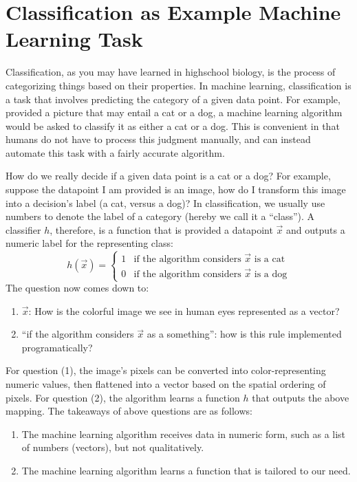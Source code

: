 \section{Classification as Example Machine Learning Task}
Classification, as you may have learned in highschool biology, is the process of categorizing things based on their properties.
In machine learning, classification is a task that involves predicting the category of a given data point.
For example, provided a picture that may entail a cat or a dog, a machine learning algorithm would be asked to classify it as either a cat or a dog.
This is convenient in that humans do not have to process this judgment manually, and can instead automate this task with a fairly accurate algorithm.

How do we really decide if a given data point is a cat or a dog?
For example, suppose the datapoint I am provided is an image, how do I transform this image into a decision's label (a cat, versus a dog)?
In classification, we usually use numbers to denote the label of a category (hereby we call it a ``class'').
A classifier $h$, therefore, is a function that is provided a datapoint $\vec{x}$ and outputs a numeric label for the representing class:
\[
    h(\vec{x}) = \begin{cases}
        1 & \text{if the algorithm considers } \vec{x} \text{ is a cat} \\
        0 & \text{if the algorithm considers } \vec{x} \text{ is a dog}
    \end{cases}
\]
The question now comes down to:
\begin{enumerate}
    \item $\vec{x}$: How is the colorful image we see in human eyes represented as a vector?
    \item ``if the algorithm considers $\vec{x}$ as a something'': how is this rule implemented programatically?
\end{enumerate}
For question (1), the image's pixels can be converted into color-representing numeric values, then flattened into a vector based on the spatial ordering of pixels.
For question (2), the algorithm learns a function $h$ that outputs the above mapping.
The takeaways of above questions are as follows:
\begin{enumerate}
    \item The machine learning algorithm receives data in numeric form, such as a list of numbers (vectors), but not qualitatively.
    \item The machine learning algorithm learns a function that is tailored to our need.
\end{enumerate}

